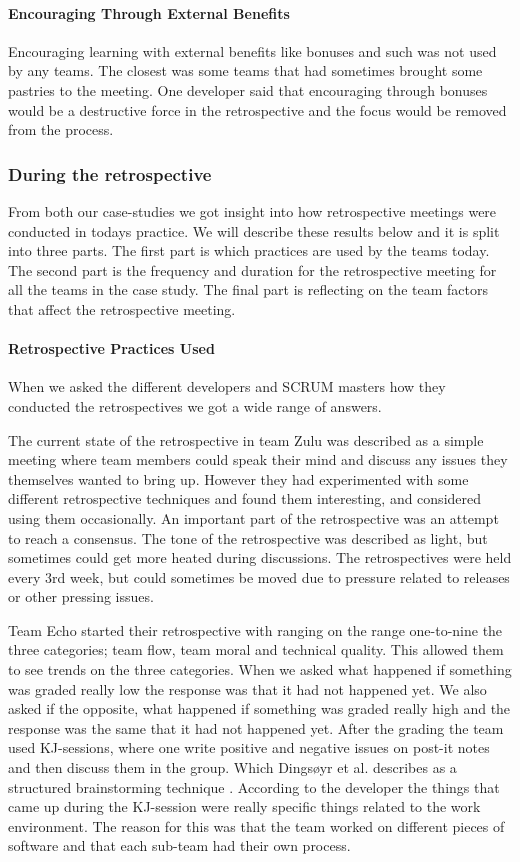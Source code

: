 \paragraph{Encouraging Through External Benefits}
\label{question-9}
Encouraging learning with external benefits like bonuses and such was not used by any teams. The closest was some teams that had sometimes brought some pastries to the meeting. One developer said that encouraging through bonuses would be a destructive force in the retrospective and the focus would be removed from the process.


\label{question-3}

\subsubsection{During the retrospective}
From both our case-studies we got insight into how retrospective meetings were conducted in todays practice. We will describe these results below and it is split into three parts. The first part is which practices are used by the teams today. The second part is the frequency and duration for the retrospective meeting for all the teams in the case study. The final part is reflecting on the team factors that affect the retrospective meeting.

\paragraph{Retrospective Practices Used}
When we asked the different developers and SCRUM masters how they conducted the retrospectives we got a wide range of answers. 

The current state of the retrospective in team Zulu was described as a simple meeting where team members could speak their mind and discuss any issues they themselves wanted to bring up. However they had experimented with some different retrospective techniques and found them interesting, and considered using them occasionally. An important part of the retrospective was an attempt to reach a consensus. The tone of the retrospective was described as light, but sometimes could get more heated during discussions. The retrospectives were held every 3rd week, but could sometimes be moved due to pressure related to releases or other pressing issues.

Team Echo started their retrospective with ranging on the range one-to-nine the three categories; team flow, team moral and technical quality. This allowed them to see trends on the three categories. When we asked what happened if something was graded really low the response was that it had not happened yet. We also asked if the opposite, what happened if something was graded really high and the response was the same that it had not happened yet. After the grading the team used KJ-sessions, where one write positive and negative issues on post-it notes and then discuss them in the group. Which Dingsøyr et al. describes as a structured brainstorming technique \cite{Dingsoyr2003}. According to the developer the things that came up during the KJ-session were really specific things related to the work environment. The reason for this was that the team worked on different pieces of software and that each sub-team had their own process. 

